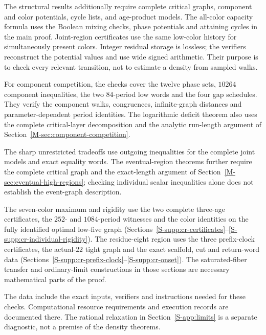 \documentclass[11pt,reqno]{amsart}
\theoremstyle{plain}
\theoremstyle{plain}
\theoremstyle{plain}
\begin{document}
The structural results additionally require complete critical graphs,
component and color potentials, cycle lists, and age-product models.
The all-color capacity formula uses the Boolean mixing checks, phase
potentials and attaining cycles in the main proof. Joint-region
certificates use the same low-color history for simultaneously present
colors. Integer residual storage is lossless; the verifiers reconstruct
the potential values and use wide signed arithmetic. Their purpose is
to check every relevant transition, not to estimate a density from
sampled walks.

For component competition, the checks cover the twelve phase sets,
$10264$ component inequalities, the two $84$-period low words and
the four gap schedules. They verify the component walks, congruences,
infinite-graph distances and parameter-dependent period identities.
The logarithmic deficit theorem also uses the complete critical-layer
decomposition and the analytic run-length argument of
Section~\ref*{M-sec:component-competition}.

The sharp unrestricted tradeoffs use outgoing inequalities for the
complete joint models and exact equality words. The eventual-region
theorems further require the complete critical graph and the exact-length
argument of Section~\ref*{M-sec:eventual-high-regions}; checking individual
scalar inequalities alone does not establish the event-graph description.

The seven-color maximum and rigidity use the two complete three-age
certificates, the $252$- and $1084$-period witnesses and the color
identities on the fully identified optimal low-five graph
(Sections~\ref{S-supp:cr-certificates}--\ref{S-supp:cr-individual-rigidity}).
The residue-eight region uses the three prefix-clock certificates,
the actual-$22$ tight graph and the exact scaffold, cut and return-word
data (Sections~\ref{S-supp:cr-prefix-clock}--\ref{S-supp:cr-onset}).
The saturated-fiber transfer and ordinary-limit constructions in those
sections are necessary mathematical parts of the proof.

The data include the exact inputs, verifiers and instructions needed
for these checks. Computational resource requirements and execution
records are documented there. The rational relaxation in
Section~\ref{S-app:limits} is a separate diagnostic, not a premise of
the density theorems.
\end{document}
